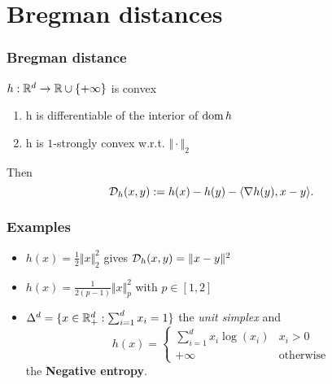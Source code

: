 \documentclass{beamer}
\begin{document}
\section{Bregman distances}%

\begin{frame}
  \frametitle{Bregman distance}
  $h: \mathbb{R}^d \to \mathbb{R} \cup \{+\infty\}$ is convex
  \begin{enumerate}
    \item h is differentiable of the interior of $\operatorname*{dom} h$
    \item h is $1$-strongly convex w.r.t. $\Vert \cdot \Vert_2$
  \end{enumerate}
  Then
  \begin{equation}
    \mathcal{D}_h(x,y) := h(x) - h(y) - \langle \nabla h(y), x-y \rangle.
  \end{equation}

\end{frame}


\begin{frame}
  \frametitle{Examples} %
  \begin{itemize}
    \item $h(x) = \frac12 \Vert x \Vert_2^2$ gives $\mathcal{D}_h(x,y) = \Vert x-y \Vert^2$
    \item $h(x) = \frac{1}{2(p-1)} \Vert x \Vert_p^2$ with $p \in [1, 2]$
    \item  $\Delta^d= \{x \in \mathbb{R}^d_+ : \sum_{i=1}^{d}x_i = 1\}$ the \emph{unit simplex} and
          \begin{equation}
            h(x) =
            \begin{cases}
              \sum_{i=1}^{d} x_i \log(x_i) & x_i > 0 \\
              +\infty & \text{otherwise}
            \end{cases}
          \end{equation}
          the \textbf{Negative entropy}.\\
  \end{itemize}
\end{frame}
\end{document}
